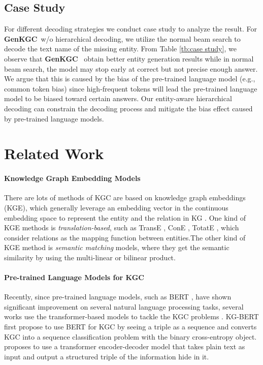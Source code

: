 \documentclass[sigconf]{acmart}
\newcommand{\ours}{\textbf{GenKGC}}
\begin{document}
\subsection{Case Study}
For different decoding strategies we conduct case study to analyze the result.
For \ours~w/o hierarchical decoding, we utilize the normal beam search to decode the text name of the missing entity.
From Table \ref{tb:case study}, we observe that \ours~ obtain better entity generation results while in normal beam search, the model may stop early at correct but not precise enough answer.
We argue that this is caused by the bias of the pre-trained language model (e.g., common token bias) since high-frequent tokens will lead the pre-trained language model to be biased toward certain answers.
Our entity-aware hierarchical decoding can constrain the decoding process and mitigate the bias effect caused by pre-trained language models. 


\section{Related Work}
\paragraph{Knowledge Graph Embedding Models}
There are lots of methods of KGC are based on knowledge graph embeddings (KGE), which generally leverage an embedding vector in the continuous embedding space to represent the entity and the relation in KG \cite{DBLP:conf/www/ZhangDSCZC20}.
One kind of KGE methods is \textit{translation-based}, such as TransE \cite{Bordes:TransE},  ConE \cite{zhang2021cone}, TotatE \cite{RotatE},  which consider relations as the mapping function between entities.The other kind of KGE method is \textit{semantic matching} models, where they get the semantic similarity by using the multi-linear or bilinear product.

\paragraph{Pre-trained Language Models for KGC}
Recently, since pre-trained language models, such as BERT \cite{devlin2018bert}, have shown significant improvement on several natural language processing tasks, several works use the transformer-based models to tackle the KGC problems \cite{DBLP:journals/corr/abs-2201-05575,DBLP:journals/corr/abs-2201-11332,DBLP:journals/corr/abs-2201-11147}. 
KG-BERT \cite{kgbert} first propose to use BERT for KGC by seeing a triple as a sequence and converts KGC into a sequence classification problem with the binary cross-entropy object.
\cite{DBLP:journals/corr/abs-2112-08340} proposes to use a transformer encoder-decoder model that takes plain text as input and output a structured triple of the information hide in it.
\end{document}
